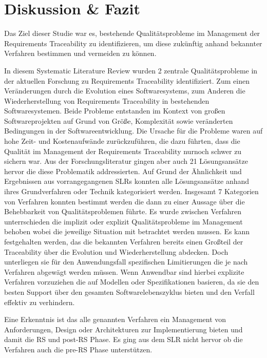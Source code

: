 \section{Diskussion \& Fazit}
\label{sec:DiskussionFazit}

Das Ziel dieser Studie war es, bestehende Qualitätsprobleme im Management der Requirements Traceability zu identifizieren, um diese zukünftig anhand bekannter Verfahren bestimmen und vermeiden zu können.

In diesem Systematic Literature Review wurden 2 zentrale Qualitätsprobleme in der aktuellen Forschung zu Requirements Traceability identifiziert. Zum einen Veränderungen durch die Evolution eines Softwaresystems, zum Anderen die Wiederherstellung von Requirements Traceability in bestehenden Softwaresystemen. Beide Probleme entstanden im Kontext von großen Softwareprojekten auf Grund von Größe, Komplexität sowie veränderten Bedingungen in der Softwareentwicklung. Die Ursache für die Probleme waren auf hohe Zeit- und Kostenaufwände zurückzuführen, die dazu führten, dass die Qualität im Management der Requirements Traceability nurnoch schwer zu sichern war. Aus der Forschungsliteratur gingen aber auch 21 Lösungsansätze hervor die diese Problematik addressierten. Auf Grund der Ähnlichkeit und Ergebnissen aus vorrangegangenen SLRs konnten alle Lösungsansätze anhand ihres Grundverfahren oder Technik kategorisiert werden. Insgesamt 7 Kategorien von Verfahren konnten bestimmt werden die dann zu einer Aussage über die Behebbarkeit von Qualitätsproblemen führte. Es wurde zwischen Verfahren unterrschieden die implizit oder explizit Qualitätsprobleme im Management behoben wobei die jeweilige Situation mit betrachtet werden mussen. Es kann festgehalten werden, das die bekannten Verfahren bereits einen Großteil der Traceability über die Evolution und Wiederherstellung abdecken. Doch unterliegen sie für den Anwendungsfall spezifischen Limitierungen die je nach Verfahren abgewägt werden müssen. Wenn Anwendbar sind hierbei explizite Verfahren vorzuziehen die auf Modellen oder Spezifikationen basieren, da sie den besten Support über den gesamten Softwarelebenszyklus bieten und den Verfall effektiv zu verhindern. 

Eine Erkenntnis ist das alle genannten Verfahren ein Management von Anforderungen, Design oder Architekturen zur Implementierung bieten und damit die RS und post-RS Phase. Es ging aus dem SLR nicht hervor ob die Verfahren auch die pre-RS Phase unterstützen.


